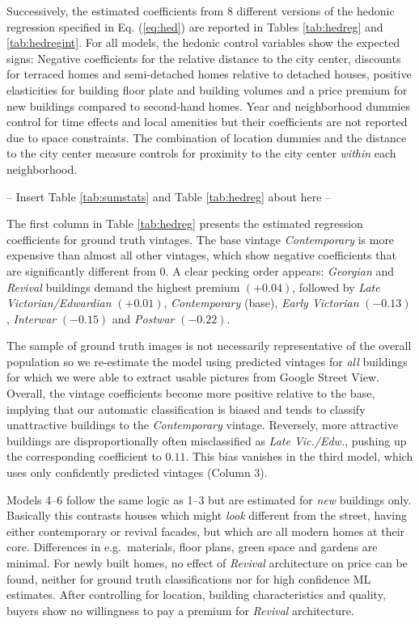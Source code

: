 \documentclass[]{article}
\begin{document}
Successively, the estimated coefficients from 8 different versions of
the hedonic regression specified in Eq. (\ref{eq:hed}) are reported in
Tables \ref{tab:hedreg} and \ref{tab:hedregint}. For all models, the
hedonic control variables show the expected signs: Negative coefficients
for the relative distance to the city center, discounts for terraced
homes and semi-detached homes relative to detached houses, positive
elasticities for building floor plate and building volumes and a price
premium for new buildings compared to second-hand homes. Year and
neighborhood dummies control for time effects and local amenities but
their coefficients are not reported due to space constraints. The
combination of location dummies and the distance to the city center
measure controls for proximity to the city center \emph{within} each
neighborhood.

\begin{center}
  -- Insert Table \ref{tab:sumstats} and Table \ref{tab:hedreg} about here --
\end{center}

The first column in Table \ref{tab:hedreg} presents the estimated
regression coefficients for ground truth vintages. The base vintage
\emph{Contemporary} is more expensive than almost all other vintages,
which show negative coefficients that are significantly different from
0. A clear pecking order appears: \emph{Georgian} and \emph{Revival}
buildings demand the highest premium \((+0.04)\), followed by \emph{Late
Victorian/Edwardian} \((+0.01)\), \emph{Contemporary} (base),
\emph{Early Victorian} \((-0.13)\), \emph{Interwar} \((-0.15)\) and
\emph{Postwar} \((-0.22)\).

The sample of ground truth images is not necessarily representative of
the overall population so we re-estimate the model using predicted
vintages for \emph{all} buildings for which we were able to extract
usable pictures from Google Street View. Overall, the vintage
coefficients become more positive relative to the base, implying that
our automatic classification is biased and tends to classify
unattractive buildings to the \emph{Contemporary} vintage. Reversely,
more attractive buildings are disproportionally often misclassified as
\emph{Late Vic./Edw.}, pushing up the corresponding coefficient to
\(0.11\). This bias vanishes in the third model, which uses only
confidently predicted vintages (Column 3).

Models 4--6 follow the same logic as 1--3 but are estimated for
\emph{new} buildings only. Basically this contrasts houses which might
\emph{look} different from the street, having either contemporary or
revival facades, but which are all modern homes at their core.
Differences in e.g.~materials, floor plans, green space and gardens are
minimal. For newly built homes, no effect of \emph{Revival} architecture
on price can be found, neither for ground truth classifications nor for
high confidence ML estimates. After controlling for location, building
characteristics and quality, buyers show no willingness to pay a premium
for \emph{Revival} architecture.
\end{document}

